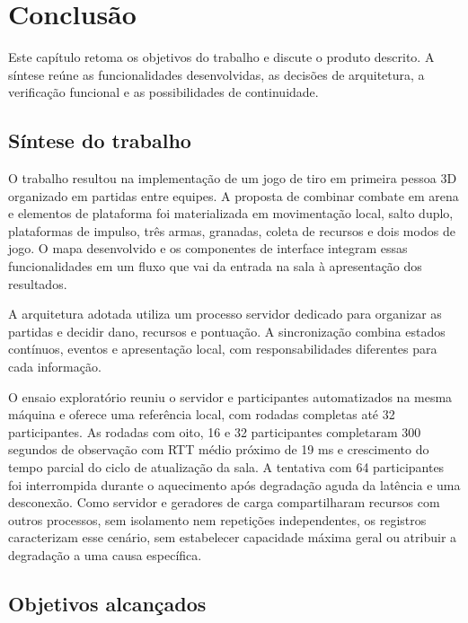 \chapter{Conclusão}\label{cap:tcc2-6}

Este capítulo retoma os objetivos do trabalho e discute o produto descrito. A síntese reúne as funcionalidades desenvolvidas, as decisões de arquitetura, a verificação funcional e as possibilidades de continuidade.

\section{Síntese do trabalho}\label{sec:6.1}

O trabalho resultou na implementação de um jogo de tiro em primeira pessoa 3D organizado em partidas entre equipes. A proposta de combinar combate em arena e elementos de plataforma foi materializada em movimentação local, salto duplo, plataformas de impulso, três armas, granadas, coleta de recursos e dois modos de jogo. O mapa desenvolvido e os componentes de interface integram essas funcionalidades em um fluxo que vai da entrada na sala à apresentação dos resultados.

A arquitetura adotada utiliza um processo servidor dedicado para organizar as partidas e decidir dano, recursos e pontuação. A sincronização combina estados contínuos, eventos e apresentação local, com responsabilidades diferentes para cada informação.

O ensaio exploratório reuniu o servidor e participantes automatizados na mesma máquina e oferece uma referência local, com rodadas completas até 32 participantes. As rodadas com oito, 16 e 32 participantes completaram 300 segundos de observação com RTT médio próximo de 19 ms e crescimento do tempo parcial do ciclo de atualização da sala. A tentativa com 64 participantes foi interrompida durante o aquecimento após degradação aguda da latência e uma desconexão. Como servidor e geradores de carga compartilharam recursos com outros processos, sem isolamento nem repetições independentes, os registros caracterizam esse cenário, sem estabelecer capacidade máxima geral ou atribuir a degradação a uma causa específica.

\section{Objetivos alcançados}\label{sec:6.2}

